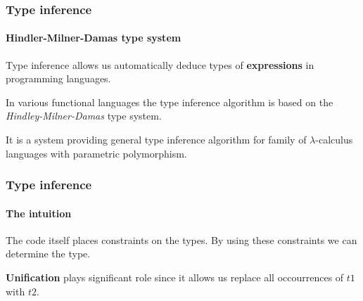\documentclass{beamer}
\newcommand{\vpad}{\vspace{5pt}}
\newcommand{\vPad}{\vspace{10pt}}
\begin{document}
\begin{frame} \frametitle{Type inference}
  \framesubtitle{Hindler-Milner-Damas type system}
  Type inference allows us automatically deduce types of \textbf{expressions} in programming languages.
  
  \vPad
  In various functional languages the type inference algorithm is based on the \textit{Hindley-Milner-Damas}
  type system. 

  \vpad
  It is a system providing general type inference algorithm for family of $\lambda$-calculus languages 
  with parametric polymorphism.
\end{frame}

\begin{frame} \frametitle{Type inference}
  \framesubtitle{The intuition}
  The code itself places constraints on the types. By using these constraints we can determine the type.
  
  \vpad
  \textbf{Unification} plays significant role since it allows us replace all occourrences of $t1$ with $t2$.
\end{frame}




\end{document}
